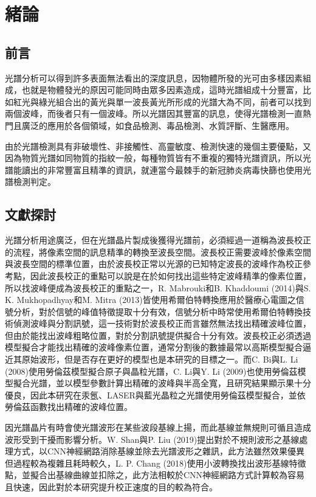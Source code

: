 \titlespacing{\chapter}{0cm}{-2cm}{0cm}
\chapter{緒論}
\section{前言}
光譜分析可以得到許多表面無法看出的深度訊息，因物體所發的光可由多樣因素組成，也就是物體發光的原因可能同時由眾多因素造成，這時光譜組成十分豐富，比如紅光與綠光組合出的黃光與單一波長黃光所形成的光譜大為不同，前者可以找到兩個波峰，而後者只有一個波峰。所以光譜因其豐富的訊息，使得光譜檢測一直熱門且廣泛的應用於各個領域，如食品檢測、毒品檢測、水質評斷、生醫應用。\par
由於光譜檢測具有非破壞性、非接觸性、高靈敏度、檢測快速的幾個主要優點，又因為物質光譜如同物質的指紋一般，每種物質皆有不重複的獨特光譜資訊，所以光譜能讀出的非常豐富且精準的資訊，就連當今最棘手的新冠肺炎病毒快篩也使用光譜檢測判定。
\section{文獻探討}

光譜分析用途廣泛，但在光譜晶片製成後獲得光譜前，必須經過一道稱為波長校正的流程，將像素空間的訊息精準的轉換至波長空間。波長校正需要波峰於像素空間與波長空間的標準位置，由於波長校正常以光源的已知特定波長的波峰作為校正參考點，因此波長校正的重點可以說是在於如何找出這些特定波峰精準的像素位置，所以找波峰便成為波長校正的重點之一，R. Mabrouki和B. Khaddoumi (2014)\cite{Hilbert-1}與S. K. Mukhopadhyay和M. Mitra (2013)\cite{Hilbert-2}皆使用希爾伯特轉換應用於醫療心電圖之信號分析，對於信號的峰值特徵提取十分有效，信號分析中時常使用希爾伯特轉換技術偵測波峰與分割訊號，這一技術對於波長校正而言雖然無法找出精確波峰位置，但由於能找出波峰粗略位置，對於分割訊號提供擬合十分有效。波長校正必須透過模型擬合才能找出精確的波峰像素位置，通常分割後的數據最常以高斯模型擬合逼近其原始波形，但是否存在更好的模型也是本研究的目標之一。而C. Bi與L. Li (2008)\cite{Lorentz-00}使用勞倫茲模型擬合原子與晶粒光譜，C. Li與Y. Li (2009)\cite{Lorentz-01}也使用勞倫茲模型擬合光譜，並以模型參數計算出精確的波峰與半高全寬，且研究結果顯示果十分優良，因此本研究在汞氬、LASER與藍光晶粒之光譜使用勞倫茲模型擬合，並依勞倫茲函數找出精確的波峰位置。
\par
因光譜晶片有時會使光譜波形在某些波段基線上揚，而此基線並無規則可循且造成波形受到干擾而影響分析。W. Shan與P. Liu (2019)\cite{BaselineCNN}提出對於不規則波形之基線處理方式，以CNN神經網路消除基線並除去光譜波形之雜訊，此方法雖然效果優異但過程較為複雜且耗時較久，L. P. Chang (2018)\cite{LP-BaseLine}使用小波轉換找出波形基線特徵點，並擬合出基線曲線並扣除之，此方法相較於CNN神經網路方式計算較為容易且快速，因此對於本研究提升校正速度的目的較為符合。

